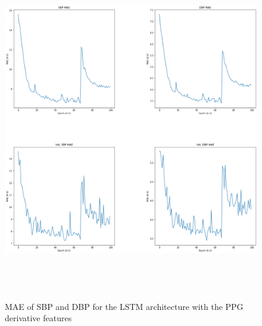 \begin{figure}[H]
    \centering
    \includegraphics[width=15cm,height=15cm,keepaspectratio]{Results/lstmDeriv.png}
    \caption{MAE of SBP and DBP for the LSTM architecture with the PPG derivative features}
    \label{lstmDerivResults}
\end{figure}

